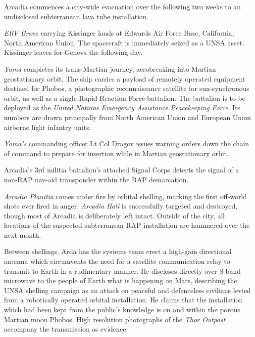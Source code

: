 Arcadia commences a city-wide evacuation over the following two weeks to an undisclosed subterranean lava tube installation.
\StopTimelineDate

{\it ERV Bravo} carrying Kissinger lands at Edwards Air Force Base, California, North American Union. The spacecraft is immediately seized as a UNSA asset. Kissinger leaves for Geneva the following day.
\StopTimelineDate

{\it Yama} completes its trans-Martian journey, aerobreaking into Martian geostationary orbit. The ship carries a payload of remotely operated equipment destined for Phobos, a photographic reconnaissance satellite for sun-synchronous orbit, as well as a single Rapid Reaction Force battalion. The battalion is to be deployed as the {\it United Nations Emergency Assistance Peacekeeping Force}. Its numbers are drawn principally from North American Union and European Union airborne light infantry units.
\StopTimelineDate

{\it Yama's} commanding officer Lt Col Dragov issues warning orders down the chain of command to prepare for insertion while in Martian geostationary orbit.
\StopTimelineDate

Arcadia's 3rd militia battalion's attached Signal Corps detects the signal of a non-RAP nav-aid transponder within the RAP demarcation.
\StopTimelineDate

{\it Arcadia Planitia} comes under fire by orbital shelling, marking the first off-world shots ever fired in anger. {\it Arcadia Hall} is successfully targeted and destroyed, though most of Arcadia is deliberately left intact. Outside of the city, all locations of the suspected subterranean RAP installation are hammered over the next month.

Between shellings, Arda has the systems team erect a high-gain directional antenna which circumvents the need for a satellite communication relay to transmit to Earth in a rudimentary manner. He discloses directly over S-band microwave to the people of Earth what is happening on Mars, describing the UNSA shelling campaign as an attack on peaceful and defenceless civilians levied from a robotically operated orbital installation. He claims that the installation which had been kept from the public's knowledge is on and within the porous Martian moon Phobos. High resolution photographs of the {\it Thor Outpost} accompany the transmission as evidence.

